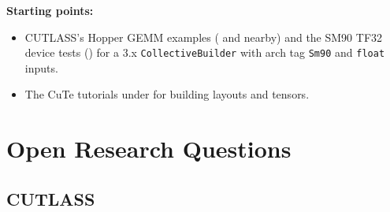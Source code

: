 \documentclass[10pt,letterpaper]{article}
\begin{document}
\textbf{Starting points:}
\begin{itemize}
  \item CUTLASS's Hopper GEMM examples ( and nearby) and the SM90 TF32 device tests () for a 3.x \texttt{CollectiveBuilder} with arch tag \texttt{Sm90} and \texttt{float} inputs.
  \item The CuTe tutorials under  for building layouts and tensors.
\end{itemize}

\section*{Open Research Questions}

\subsection*{CUTLASS}
\end{document}
